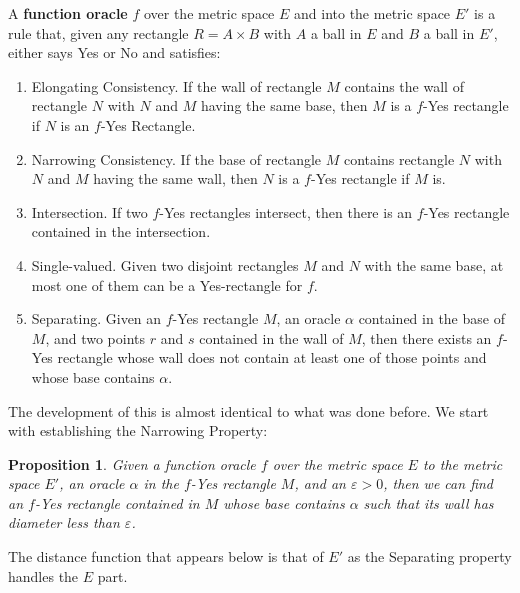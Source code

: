 \documentclass[12pt]{article}
\newtheorem{proposition}{Proposition}
\theoremstyle{remark}
\begin{document}
A \textbf{function oracle} $f$ over the metric space $E$ and into the metric space $E'$ is a rule that, given any rectangle $R= A \times B$ with $A$ a ball in $E$ and $B$ a ball in  $E'$, either says Yes or No and satisfies: 
\begin{enumerate}
    \item Elongating Consistency. If the wall of rectangle $M$ contains the wall of rectangle $N$ with $N$ and $M$ having the same base,  then $M$ is a $f$-Yes rectangle if $N$  is an $f$-Yes Rectangle. 
    \item Narrowing Consistency. If the base of rectangle $M$ contains rectangle $N$ with $N$ and $M$ having the same wall, then $N$ is a $f$-Yes rectangle if $M$ is. 
    \item Intersection. If two $f$-Yes rectangles intersect, then there is an $f$-Yes rectangle contained in the intersection. 
    \item Single-valued. Given two disjoint rectangles $M$ and $N$ with the same base, at most one of them can be a Yes-rectangle for $f$. 
    \item Separating. Given an $f$-Yes rectangle $M$, an oracle $\alpha$ contained in the base of $M$, and two points $r$ and $s$ contained in the wall of $M$, then there exists an $f$-Yes rectangle whose wall does not contain at least one of those points and whose base contains $\alpha$.
\end{enumerate} 

The development of this is almost identical to what was done before. We start with establishing the Narrowing Property: 

\begin{proposition}\label{pr:metricfshrink}
Given a function oracle $f$ over the metric space $E$ to the metric space $E'$, an oracle $\alpha$ in the $f$-Yes rectangle $M$, and an $\varepsilon > 0$, then we can find an $f$-Yes rectangle contained in $M$ whose base contains $\alpha$ such that its wall has diameter less than $\varepsilon$.
\end{proposition}

The distance function that appears below is that of $E'$ as the Separating property handles the $E$ part. 
\end{document}
